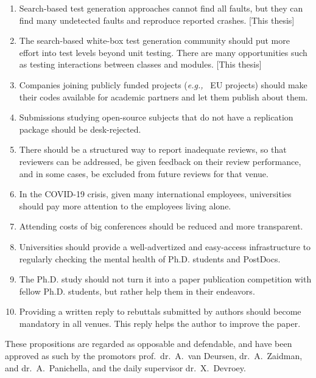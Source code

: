 \documentclass{propositions}
\begin{document}
\begin{enumerate}
\item Search-based test generation approaches cannot find all faults, but they can find many undetected faults and reproduce reported crashes. [This thesis]
\item The search-based white-box test generation community should put more effort into test levels beyond unit testing. There are many opportunities such as testing interactions between classes and modules. [This thesis]
\item Companies joining publicly funded projects (\textit{e.g.,~} EU projects) should make their codes available for academic partners and let them publish about them.
\item Submissions studying open-source subjects that do not have a replication package should be desk-rejected.
\item There should be a structured way to report inadequate reviews, so that reviewers can be addressed, be given feedback on their review performance, and in some cases, be excluded from future reviews for that venue.
\item In the COVID-19 crisis,  given many international employees, universities should pay more attention to the employees living alone.
\item Attending costs of big conferences should be reduced and more transparent.
\item Universities should provide a well-advertized and easy-access infrastructure to regularly checking the mental health of Ph.D. students and PostDocs. 
\item The Ph.D. study should not turn it into a paper publication competition with fellow Ph.D. students, but rather help them in their endeavors. 
\item Providing a written reply to rebuttals submitted by authors should become mandatory in all venues. This reply helps the author to improve the paper.
\end{enumerate}

\bigskip

\begin{center}

These propositions are regarded as opposable and defendable, and have been approved as such by the
promotors prof.\ dr.\ A.\ van Deursen, dr.\ A.\ Zaidman, and dr.\ A.\ Panichella, and the daily supervisor dr.\ X.\ Devroey.
\end{center}
\end{document}
